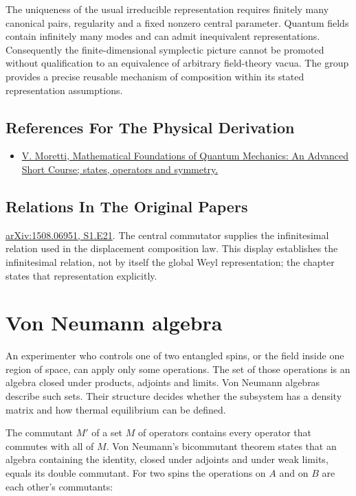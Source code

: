 \documentclass[11pt,oneside]{book}
\begin{document}
The uniqueness of the usual irreducible representation requires finitely many canonical pairs, regularity and a fixed nonzero central parameter. Quantum fields contain infinitely many modes and can admit inequivalent representations. Consequently the finite-dimensional symplectic picture cannot be promoted without qualification to an equivalence of arbitrary field-theory vacua. The group provides a precise reusable mechanism of composition within its stated representation assumptions.

\subsection*{References For The Physical Derivation}
\begin{itemize}
\item \href{https://arxiv.org/abs/1508.06951}{V. Moretti, Mathematical Foundations of Quantum Mechanics: An Advanced Short Course; states, operators and symmetry.}
\end{itemize}

\subsection*{Relations In The Original Papers}

\href{https://arxiv.org/html/1508.06951#S1.E21}{arXiv:1508.06951, S1.E21}. The central commutator supplies the infinitesimal relation used in the displacement composition law. This display establishes the infinitesimal relation, not by itself the global Weyl representation; the chapter states that representation explicitly.



\clearpage

\section{Von Neumann algebra}

\label{topic:von-neumann-algebra}

An experimenter who controls one of two entangled spins, or the field inside one region of space, can apply only some operations. The set of those operations is an algebra closed under products, adjoints and limits. Von Neumann algebras describe such sets. Their structure decides whether the subsystem has a density matrix and how thermal equilibrium can be defined.

The commutant \(M'\) of a set \(M\) of operators contains every operator that commutes with all of \(M\). Von Neumann's bicommutant theorem states that an algebra containing the identity, closed under adjoints and under weak limits, equals its double commutant. For two spins the operations on \(A\) and on \(B\) are each other's commutants:
\end{document}
